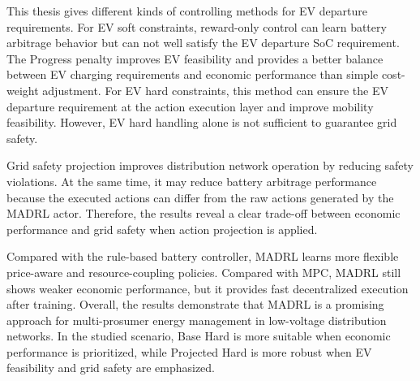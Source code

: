 This thesis gives different kinds of controlling methods for EV departure requirements. For EV soft constraints, reward-only control can learn battery arbitrage behavior but can not well satisfy the EV departure SoC requirement. The Progress penalty improves EV feasibility and provides a better balance between EV charging requirements and economic performance than simple cost-weight adjustment. For EV hard constraints, this method can ensure the EV departure requirement at the action execution layer and improve mobility feasibility. However, EV hard handling alone is not sufficient to guarantee grid safety.

Grid safety projection improves distribution network operation by reducing safety violations. At the same time, it may reduce battery arbitrage performance because the executed actions can differ from the raw actions generated by the MADRL actor. Therefore, the results reveal a clear trade-off between economic performance and grid safety when action projection is applied.

Compared with the rule-based battery controller, MADRL learns more flexible price-aware and resource-coupling policies. Compared with MPC, MADRL still shows weaker economic performance, but it provides fast decentralized execution after training. Overall, the results demonstrate that MADRL is a promising approach for multi-prosumer energy management in low-voltage distribution networks. In the studied scenario, Base Hard is more suitable when economic performance is prioritized, while Projected Hard is more robust when EV feasibility and grid safety are emphasized.

